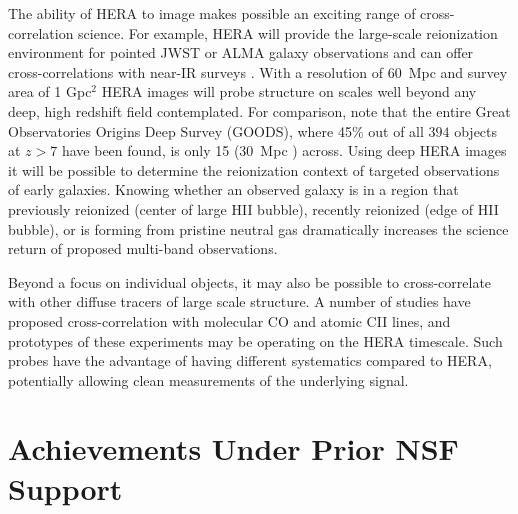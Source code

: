 \documentclass[preprint]{aastex}
\begin{document}
The ability of HERA to image makes possible an exciting range of cross-correlation science.  For example, HERA will provide the large-scale reionization environment for pointed JWST or ALMA 
galaxy observations and can offer cross-correlations with near-IR surveys \citep{lidz_et_al2009}.  With a resolution of 60~Mpc and survey area of 1 Gpc$^2$ HERA images will probe structure on scales well beyond any deep, high redshift field contemplated. For comparison, note that the entire Great Observatories Origins Deep Survey (GOODS), where 45\% out of all $394$ objects at $z > 7$ have been found, is only 15{\arcmin} (30~Mpc ) across. Using deep HERA images it will be possible to determine the reionization context of targeted observations of early galaxies. Knowing whether an observed galaxy is in a region that previously reionized (center of large HII bubble), recently reionized (edge of HII bubble), or is forming from pristine neutral gas dramatically increases the science return of proposed multi-band observations.

Beyond a focus on individual objects, it may also be possible to cross-correlate with other diffuse tracers of large scale structure.  A number of studies have proposed cross-correlation with molecular CO \cite{lidz_et_al2011} and atomic CII \citep{gong_et_al2011} lines, and prototypes of these experiments may be operating on the HERA timescale.  Such probes have the advantage of having different systematics compared to HERA, potentially allowing clean measurements of the underlying signal.



\section{Achievements Under Prior NSF Support} %
\end{document}
